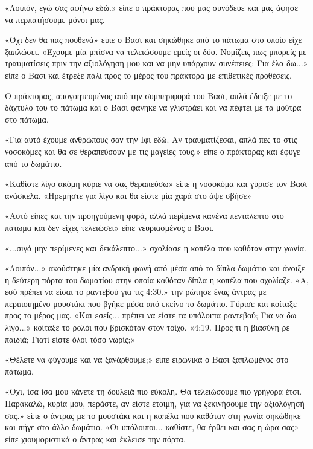 \documentclass[12pt,twoside, openany]{book}
\begin{document}
«Λοιπόν, εγώ σας αφήνω εδώ.» είπε ο πράκτορας που μας συνόδευε και μας άφησε να περπατήσουμε μόνοι μας.

«Όχι δεν θα πας πουθενά» είπε ο Βασι και σηκώθηκε από το πάτωμα στο οποίο είχε ξαπλώσει. «Έχουμε μία μπίσνα να τελειώσουμε εμείς οι δύο. Νομίζεις πως μπορείς με τραυματίσεις πριν την αξιολόγηση μου και να μην υπάρχουν συνέπειες; Για έλα δω...» είπε ο Βασι και έτρεξε πάλι προς το μέρος του πράκτορα με επιθετικές προθέσεις.

Ο πράκτορας, απογοητευμένος από την συμπεριφορά του Βασι, απλά έδειξε με το δάχτυλο του το πάτωμα και ο Βασι φάνηκε να γλιστράει και να πέφτει με τα μούτρα στο πάτωμα.

«Για αυτό έχουμε ανθρώπους σαν την Ιφι εδώ. Αν τραυματίζεσαι, απλά πες το στις νοσοκόμες και θα σε θεραπεύσουν με τις μαγείες τους.» είπε ο πράκτορας και έφυγε από το δωμάτιο.

«Καθίστε λίγο ακόμη κύριε να σας θεραπεύσω» είπε η νοσοκόμα και γύρισε τον Βασι ανάσκελα. «Ηρεμήστε για λίγο και θα είστε μία χαρά στο άψε σβήσε»

«Αυτό είπες και την προηγούμενη φορά, αλλά περίμενα κανένα πεντάλεπτο στο πάτωμα και δεν είχες τελειώσει» είπε νευριασμένος ο Βασι.

«...σιγά μην περίμενες και δεκάλεπτο...» σχολίασε η κοπέλα που καθόταν στην γωνία.

«Λοιπόν...» ακούστηκε μία ανδρική φωνή από μέσα από το δίπλα δωμάτιο και άνοιξε η δεύτερη πόρτα του δωματίου στην οποία καθόταν δίπλα η κοπέλα που σχολίαζε. «Α, εσύ πρέπει να είσαι το ραντεβού για τις 4:30.» την ρώτησε ένας άντρας με περιποιημένο μουστάκι που βγήκε μέσα από εκείνο το δωμάτιο. Γύρισε και κοίταξε προς το μέρος μας. «Και εσείς... πρέπει να είστε τα υπόλοιπα ραντεβού; Για να δω λίγο...» κοίταξε το ρολόι που βρισκόταν στον τοίχο. «4:19. Προς τι η βιασύνη ρε παιδιά; Γιατί είστε όλοι τόσο νωρίς;»

«Θέλετε να φύγουμε και να ξανάρθουμε;» είπε ειρωνικά ο Βασι ξαπλωμένος στο πάτωμα.

«Όχι, ίσα ίσα μου κάνετε τη δουλειά πιο εύκολη. Θα τελειώσουμε πιο γρήγορα έτσι. Παρακαλώ, κυρία μου, περάστε, αν είστε έτοιμη, για να ξεκινήσουμε την αξιολόγησή σας.» είπε ο άντρας με το μουστάκι και η κοπέλα που καθόταν στη γωνία σηκώθηκε και πήγε στο άλλο δωμάτιο. «Οι υπόλοιποι... καθίστε, θα έρθει και σας η ώρα σας» είπε χιουμοριστικά ο άντρας και έκλεισε την πόρτα.

\chapter{}
\end{document}
